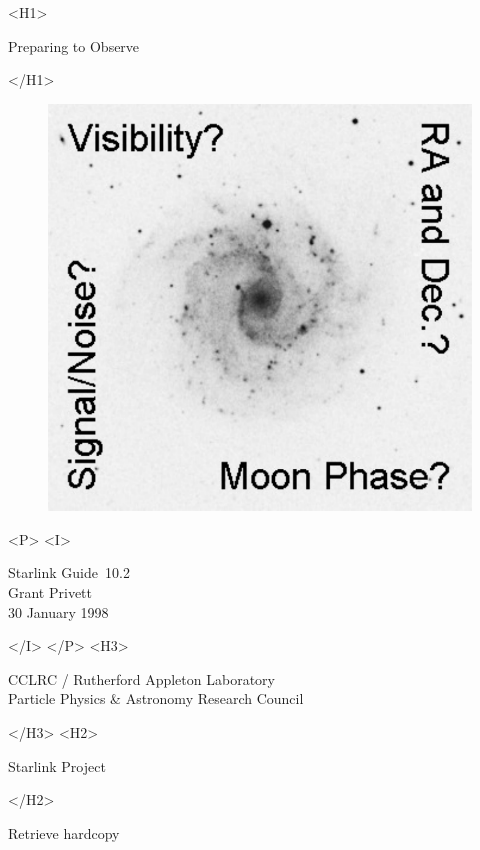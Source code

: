 \documentclass[twoside,11pt]{article}
\newcommand{\stardoccategory}  {Starlink Guide}
\newcommand{\stardocsource}    {sg\stardocnumber}
\newcommand{\stardocnumber}    {10.2}
\newcommand{\stardocauthors}   {Grant Privett}
\newcommand{\stardocdate}      {30 January 1998}
\newcommand{\stardoctitle}     {Preparing to Observe}
\newcommand{\stardocversion}   {Software and WWW-Based Resources}
\newcommand{\stardocmanual}    { }
\newcommand{\htmladdnormallink}[2]{#1}
\newcommand{\htmladdimg}[1]{}
\newcommand{\xlabel}[1]{}
\begin{document}
\begin{htmlonly}
   \xlabel{}
   \begin{rawhtml} <H1> \end{rawhtml}
      \stardoctitle
   \begin{rawhtml} </H1> \end{rawhtml}

   \vspace{10mm}
   \begin{figure}[h]
   \leavevmode
   \centering \includegraphics{sg10_front}
   \end{figure}

   \begin{rawhtml} <P> <I> \end{rawhtml}
   \stardoccategory\ \stardocnumber \\
   \stardocauthors \\
   \stardocdate
   \begin{rawhtml} </I> </P> <H3> \end{rawhtml}
      \htmladdnormallink{CCLRC}{http://www.cclrc.ac.uk} /
      \htmladdnormallink{Rutherford Appleton Laboratory}
                        {http://www.cclrc.ac.uk/ral} \\
      \htmladdnormallink{Particle Physics \& Astronomy Research Council}
                        {http://www.pparc.ac.uk} \\
   \begin{rawhtml} </H3> <H2> \end{rawhtml}
      \htmladdnormallink{Starlink Project}{http://www.starlink.ac.uk/}
   \begin{rawhtml} </H2> \end{rawhtml}
   \htmladdnormallink{\htmladdimg{source.gif} Retrieve hardcopy}
      {http://www.starlink.ac.uk/cgi-bin/hcserver?\stardocsource}\\


\end{htmlonly}
\end{document}
